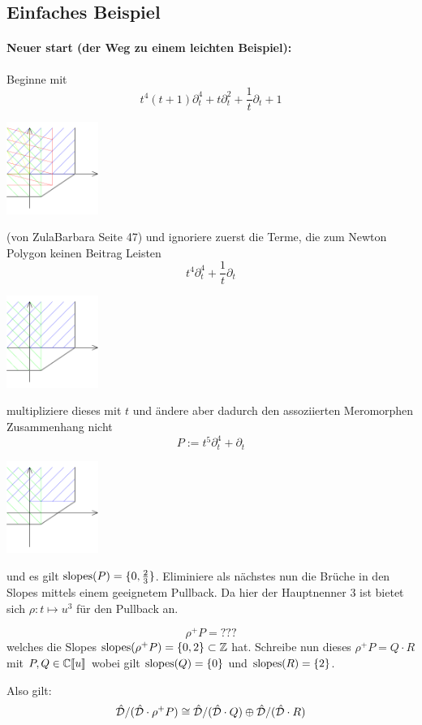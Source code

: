 \subsection{Einfaches Beispiel}
\paragraph{Neuer start (der Weg zu einem leichten Beispiel):}
Beginne mit
\[ t^4(t+1)\partial_t^4 + t\partial_t^2+\frac{1}{t}\partial_t+1 \]
\begin{center} \includegraphics[width=3cm]{beispiele/img/e.png} \end{center}
(von ZulaBarbara Seite 47)
und ignoriere zuerst die Terme, die zum Newton Polygon keinen Beitrag Leisten
\[ t^4\partial_t^4 +\frac{1}{t}\partial_t \]
\begin{center} \includegraphics[width=3cm]{beispiele/img/bar_e.png} \end{center}
multipliziere dieses mit $t$ und ändere aber dadurch den assoziierten
Meromorphen Zusammenhang nicht \cite[Chapter 5.1]{sabbah_cimpa90}
\[ P:=t^5\partial_t^4 +\partial_t \]
\begin{center} \includegraphics[width=3cm]{beispiele/img/bar_e_times_x.png} \end{center}
und es gilt $\operatorname{slopes}(P)=\{0,\frac{2}{3}\}$. Eliminiere als nächstes nun die
Brüche in den Slopes mittels einem geeignetem Pullback. Da hier der Hauptnenner
$3$ ist bietet sich $\rho:t\mapsto u^3$ für den Pullback an.

\[ \rho^+P=??? \]
welches die Slopes $\operatorname{slopes}(\rho^+P)=\{0,2\}\subset\mathbb{Z}$ hat. Schreibe nun dieses
$\rho^+P=Q\cdot R$ mit $P,Q\in{\mathbb C\llbracket u\rrbracket}$ wobei gilt $\operatorname{slopes}(Q)=\{0\}$ und
$\operatorname{slopes}(R)=\{2\}$.

Also gilt:
\[
  \hat{\mathcal{D}}/(\hat{\mathcal{D}}\cdot\rho^+P)\cong
  \hat{\mathcal{D}}/(\hat{\mathcal{D}}\cdot Q) \oplus  \hat{\mathcal{D}}/(\hat{\mathcal{D}}\cdot R)
\]

